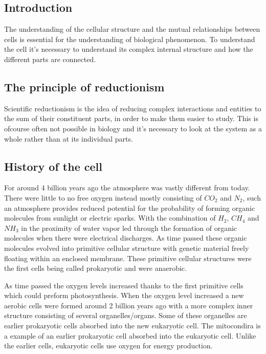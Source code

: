 \documentclass[jmp, amsmath, amssymb, reprint]{article}
\numberwithin{equation}{section}
\begin{document}
\begin{multicols}{2}
\subsection*{Introduction}

The understanding of the cellular structure and the mutual relationships between cells is essential for the understanding of biological phenomenon. To understand the cell it's necessary to understand its complex internal structure and how the different parts are connected. 

\subsection{The principle of reductionism}

Scientific reductionism is the idea of reducing complex interactions and entities to the sum of their constituent parts, in order to make them easier to study. This is ofcourse often not possible in biology and it's necessary to look at the system as a whole rather than at its individual parts.

\subsection{History of the cell}

For around 4 billion years ago the atmosphere was vastly different from today. There were little to no free oxygen instead mostly consisting of \(CO_2\) and \(N_2\), such an atmosphere provides reduced potential for the probability of forming organic molecules from sunlight or electric sparks. With the combination of \(H_2\), \(CH_4\) and \(NH_3\) in the proximity of water vapor led through the formation of organic molecules when there were electrical discharges. As time passed these organic molecules evolved into primitive cellular structure with genetic material freely floating within an enclosed membrane. These primitive cellular structures were the first cells being called prokaryotic and were anaerobic.

As time passed the oxygen levels increased thanks to the first primitive cells which could preform photosynthesis. When the oxygen level increased a new aerobic cells were formed around 2 billion years ago with a more complex inner structure consisting of several organelles/organs. Some of these organelles are earlier prokaryotic cells absorbed into the new eukaryotic cell. The mitocondira is a example of an earlier prokaryotic cell absorbed into the eukaryotic cell. Unlike the earlier cells, eukaryotic cells use oxygen for energy production.


\end{multicols}
\end{document}
